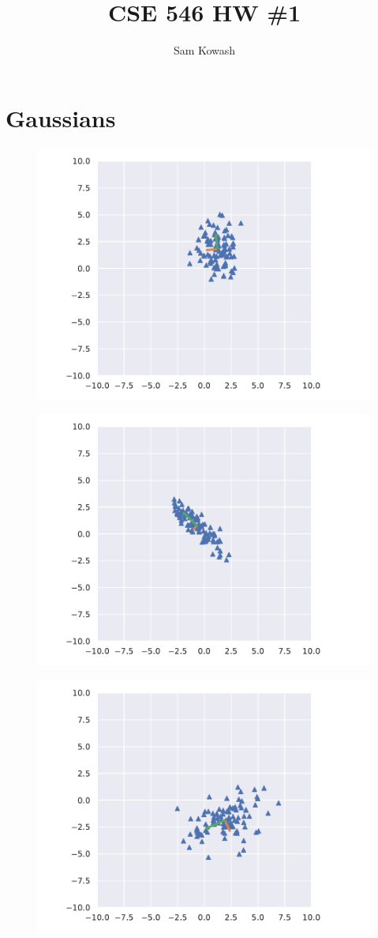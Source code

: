 \documentclass[11pt,letterpaper]{article}
\author{Sam Kowash}
\title{CSE 546 HW \#1}
\numberwithin{equation}{section}
\numberwithin{figure}{section}
\begin{document}
\maketitle
\section{Gaussians}

\begin{figure}[H]
	\centering
	\includegraphics[width=.6\textwidth]{figures/plot_0.pdf}
\end{figure}

\begin{figure}[H]
	\centering
	\includegraphics[width=.6\textwidth]{figures/plot_1.pdf}
\end{figure}

\begin{figure}[H]
	\centering
	\includegraphics[width=.6\textwidth]{figures/plot_2.pdf}
\end{figure}
\end{document}

